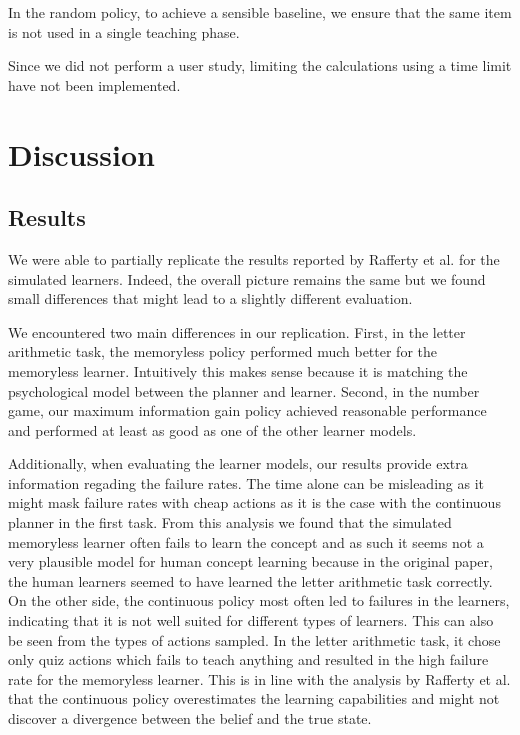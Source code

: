 In the random policy, to achieve a sensible baseline, we ensure that the same item is not used in a single teaching phase.

Since we did not perform a user study, limiting the calculations using a time limit have not been implemented. 


\section{Discussion}

\subsection{Results}
We were able to partially replicate the results reported by Rafferty et al. for the simulated learners.
Indeed, the overall picture remains the same but we found small differences that might lead to a slightly different evaluation.

We encountered two main differences in our replication. First, in the letter arithmetic task, the memoryless policy performed much better for the memoryless learner. Intuitively this makes sense because it is matching the psychological model between the planner and learner.
Second, in the number game, our maximum information gain policy achieved reasonable performance and performed at least as good as one of the other learner models.

Additionally, when evaluating the learner models, our results provide extra information regading the failure rates.
The time alone can be misleading as it might mask failure rates with cheap actions as it is the case with the continuous planner in the first task. 
From this analysis we found that the simulated memoryless learner often fails to learn the concept and as such it seems not a very plausible model for human concept learning because in the original paper, the human learners seemed to have learned the letter arithmetic task correctly.
On the other side, the continuous policy most often led to failures in the learners, indicating that it is not well suited for different types of learners.
This can also be seen from the types of actions sampled. In the letter arithmetic task, it chose only quiz actions which fails to teach anything and resulted in the high failure rate for the memoryless learner.
This is in line with the analysis by Rafferty et al. that the continuous policy overestimates the learning capabilities and might not discover a divergence between the belief and the true state.

